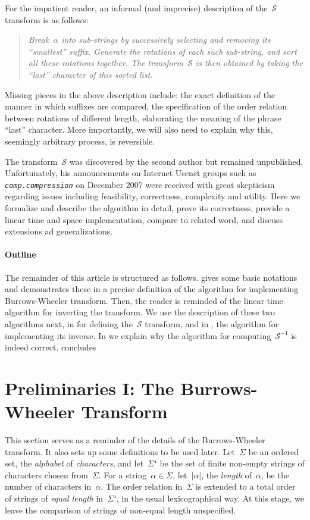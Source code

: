 \documentclass[a4paper,12pt]{article}
\newcommand{\Abs}[1]{\ensuremath{\left|#1\right|}}
\newcommand{\str}[1]{{\textit{\texttt{#1}}}}
\newcommand{\Acronym}{\ensuremath{\mathcal{S}}}
\numberwithin{algorithm}{section}
\begin{document}
For the impatient reader, an informal (and imprecise) description of the~$\Acronym$ transform
  is as follows:
\begin{quote}
\sl Break~$α$ into sub-strings by successively selecting and removing its “smallest'' suffix.
         Generate the rotations of each such sub-string, and sort all these rotations together.
        The transform~$\Acronym$ is then obtained by taking the “last'' character of this sorted list.
\end{quote}
Missing pieces in the above description include: the exact definition of the manner in which suffixes
  are compared, the specification of the order relation between rotations of different length,
  elaborating the meaning of the phrase “last'' character.
More importantly, we will also need to explain why this, seemingly arbitrary process,
  is reversible.

The transform~$\Acronym$ was discovered by the second author but remained unpublished.
Unfortunately, his announcements on Internet Usenet
  groups such as \str{comp.compression} on December 2007
  were received with great skepticism regarding issues including feasibility, correctness,
  complexity and utility.
Here we formalize and describe the algorithm in detail, prove its correctness,
  provide a linear time and space implementation, compare to related word,
  and discuss extensions ad generalizations.

\paragraph{Outline} The remainder of this article is structured as follows.
gives some basic notations and demonstrates these in a precise
  definition of the algorithm for implementing Burrows-Wheeler transform.
Then, the reader is reminded of the
  linear time algorithm for inverting the transform.
We use the description of these two algorithms next,  in  for defining the~$\Acronym$ transform,
  and in ,  the algorithm for
  implementing its inverse.
In  we explain why the algorithm for computing~$\Acronym^{-1}$
  is indeed correct.
 concludes



\section{Preliminaries I: The Burrows-Wheeler Transform}
\label{Section:BWT}
This section serves as a reminder of the details of the Burrows-Wheeler
  transform.
It also sets up some definitions to be used later.
Let~$Σ$ be an ordered set, the \emph{alphabet} of \emph{characters},
  and let~$Σ⁺$ be the set
  of finite non-empty strings of characters chosen from~$Σ$.
For a  string~$α∈Σ$, let~$\Abs{α}$, the \emph{length} of~$α$,
  be the number of characters in~$α$.
The order relation in~$Σ$ is extended to a total order of
  strings of \emph{equal length} in~$Σ⁺$,
  in the usual lexicographical way.
At this stage, we leave the comparison of strings of non-equal length
  unspecified.
\end{document}
